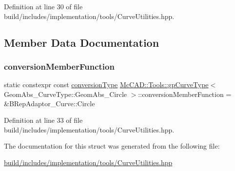 Definition at line 30 of file build/includes/implementation/tools/\+Curve\+Utilities.\+hpp.



\subsection{Member Data Documentation}
\mbox{\label{structMcCAD_1_1Tools_1_1gpCurveType_3_01GeomAbs__CurveType_1_1GeomAbs__Circle_01_4_a93f63b410bc0be1b29fc1d37f5fa19fe}} 
\subsubsection{\texorpdfstring{conversion\+Member\+Function}{conversionMemberFunction}}
{\footnotesize\ttfamily static constexpr const \hyperlink{structMcCAD_1_1Tools_1_1gpCurveType_3_01GeomAbs__CurveType_1_1GeomAbs__Circle_01_4_abd4d90aadd68dfb0068c25797413063d}{conversion\+Type} \hyperlink{structMcCAD_1_1Tools_1_1gpCurveType}{Mc\+C\+A\+D\+::\+Tools\+::gp\+Curve\+Type}$<$ Geom\+Abs\+\_\+\+Curve\+Type\+::\+Geom\+Abs\+\_\+\+Circle $>$\+::conversion\+Member\+Function = \&B\+Rep\+Adaptor\+\_\+\+Curve\+::\+Circle\hspace{0.3cm}{\ttfamily [static]}}



Definition at line 33 of file build/includes/implementation/tools/\+Curve\+Utilities.\+hpp.



The documentation for this struct was generated from the following file\+:\begin{DoxyCompactItemize}
\item 
\hyperlink{build_2includes_2implementation_2tools_2CurveUtilities_8hpp}{build/includes/implementation/tools/\+Curve\+Utilities.\+hpp}\end{DoxyCompactItemize}
